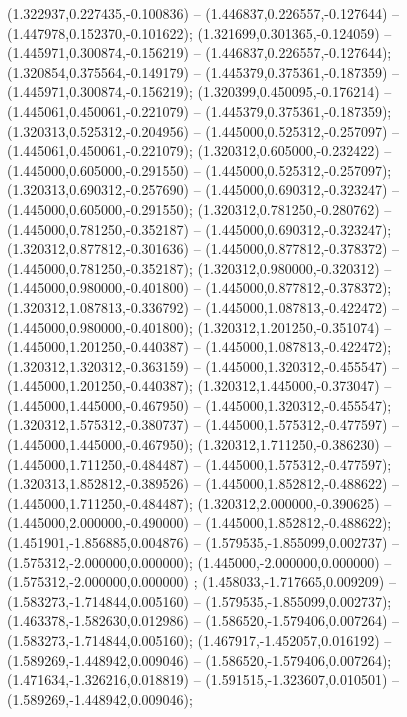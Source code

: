  (1.322937,0.227435,-0.100836) -- (1.446837,0.226557,-0.127644) -- (1.447978,0.152370,-0.101622);
 (1.321699,0.301365,-0.124059) -- (1.445971,0.300874,-0.156219) -- (1.446837,0.226557,-0.127644);
 (1.320854,0.375564,-0.149179) -- (1.445379,0.375361,-0.187359) -- (1.445971,0.300874,-0.156219);
 (1.320399,0.450095,-0.176214) -- (1.445061,0.450061,-0.221079) -- (1.445379,0.375361,-0.187359);
 (1.320313,0.525312,-0.204956) -- (1.445000,0.525312,-0.257097) -- (1.445061,0.450061,-0.221079);
 (1.320312,0.605000,-0.232422) -- (1.445000,0.605000,-0.291550) -- (1.445000,0.525312,-0.257097);
 (1.320313,0.690312,-0.257690) -- (1.445000,0.690312,-0.323247) -- (1.445000,0.605000,-0.291550);
 (1.320312,0.781250,-0.280762) -- (1.445000,0.781250,-0.352187) -- (1.445000,0.690312,-0.323247);
 (1.320312,0.877812,-0.301636) -- (1.445000,0.877812,-0.378372) -- (1.445000,0.781250,-0.352187);
 (1.320312,0.980000,-0.320312) -- (1.445000,0.980000,-0.401800) -- (1.445000,0.877812,-0.378372);
 (1.320312,1.087813,-0.336792) -- (1.445000,1.087813,-0.422472) -- (1.445000,0.980000,-0.401800);
 (1.320312,1.201250,-0.351074) -- (1.445000,1.201250,-0.440387) -- (1.445000,1.087813,-0.422472);
 (1.320312,1.320312,-0.363159) -- (1.445000,1.320312,-0.455547) -- (1.445000,1.201250,-0.440387);
 (1.320312,1.445000,-0.373047) -- (1.445000,1.445000,-0.467950) -- (1.445000,1.320312,-0.455547);
 (1.320312,1.575312,-0.380737) -- (1.445000,1.575312,-0.477597) -- (1.445000,1.445000,-0.467950);
 (1.320312,1.711250,-0.386230) -- (1.445000,1.711250,-0.484487) -- (1.445000,1.575312,-0.477597);
 (1.320313,1.852812,-0.389526) -- (1.445000,1.852812,-0.488622) -- (1.445000,1.711250,-0.484487);
 (1.320312,2.000000,-0.390625) -- (1.445000,2.000000,-0.490000) -- (1.445000,1.852812,-0.488622);
 (1.451901,-1.856885,0.004876) -- (1.579535,-1.855099,0.002737) -- (1.575312,-2.000000,0.000000);
 (1.445000,-2.000000,0.000000) -- (1.575312,-2.000000,0.000000) ;
 (1.458033,-1.717665,0.009209) -- (1.583273,-1.714844,0.005160) -- (1.579535,-1.855099,0.002737);
 (1.463378,-1.582630,0.012986) -- (1.586520,-1.579406,0.007264) -- (1.583273,-1.714844,0.005160);
 (1.467917,-1.452057,0.016192) -- (1.589269,-1.448942,0.009046) -- (1.586520,-1.579406,0.007264);
 (1.471634,-1.326216,0.018819) -- (1.591515,-1.323607,0.010501) -- (1.589269,-1.448942,0.009046);
